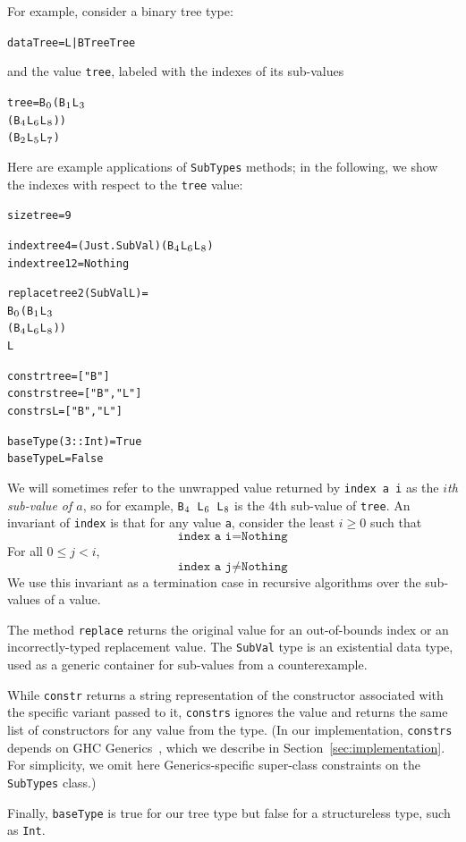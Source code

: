 \documentclass[10pt]{sigplanconf}
\newenvironment{code}{\begin{alltt}}{\end{alltt}}
\newcommand{\ttp}[1]{\texttt{#1}}
\newcommand{\sub}[1]{\(\sb{#1}\)}
\begin{document}
\noindent
For example, consider a binary tree type:
%
\begin{code}
data Tree = L | B Tree Tree
\end{code}
%
\noindent
and the value \ttp{tree}, labeled with the indexes of its sub-values
%
\begin{code}
tree = B\sub{0} (B\sub{1} L\sub{3}
             (B\sub{4} L\sub{6} L\sub{8}))
          (B\sub{2} L\sub{5} L\sub{7})
\end{code}
%
\noindent
Here are example applications of \ttp{SubTypes} methods; in the following, we
show the indexes with respect to the \ttp{tree} value:
%
\begin{code}
size tree = 9

index tree 4  = (Just . SubVal) (B\sub{4} L\sub{6} L\sub{8})
index tree 12 = Nothing

replace tree 2 (SubVal L) =
  B\sub{0} (B\sub{1} L\sub{3}
        (B\sub{4} L\sub{6} L\sub{8}))
     L

constr  tree = ["B"]
constrs tree = ["B", "L"]
constrs L    = ["B", "L"]

baseType (3 :: Int) = True
baseType L          = False
\end{code}
%
\noindent
We will sometimes refer to the unwrapped value returned by \ttp{index a i} as
the \emph{$i$th sub-value of $a$}, so for example, \ttp{B\sub{4} L\sub{6}
  L\sub{8}} is the 4th sub-value of \ttp{tree}.  An invariant of \ttp{index} is
that for any value \ttp{a}, consider the least $i \geq 0$ such that $$\ttp{index
  a i} = \ttp{Nothing}$$ For all $0 \leq j < i$, $$\ttp{index a j} \neq
\ttp{Nothing}$$ We use this invariant as a termination case in recursive
algorithms over the sub-values of a value.

The method \ttp{replace} returns the original value for an out-of-bounds index
or an incorrectly-typed replacement value.  The \ttp{SubVal} type is an
existential data type, used as a generic container for sub-values from a
counterexample.

While \ttp{constr} returns a string representation of the constructor
associated with the specific variant passed to it, \ttp{constrs} ignores the
value and returns the same list of constructors for any value from the type.
(In our implementation, \ttp{constrs} depends on GHC Generics~\cite{generics},
which we describe in Section~\ref{sec:implementation}.  For simplicity, we omit
here Generics-specific super-class constraints on the \ttp{SubTypes} class.)

Finally, \ttp{baseType} is true for our tree type but false for a structureless
type, such as \ttp{Int}.
\end{document}
